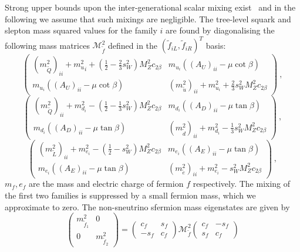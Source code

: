 \documentclass{article}
\def\half{\frac{1}{2}}
\begin{document}
Strong upper bounds upon the inter-generational scalar mixing
exist~\cite{Gabbiani:1996hi} and in the following we assume that such mixings
are negligible.
The tree-level squark and slepton mass squared values for the family $i$
are found by diagonalising the following mass
matrices ${\mathcal M}_{\tilde f}^2$ defined in the $({\tilde f}_{iL}, {\tilde
f}_{iR})^T$ basis: 
%
\begin{equation}
\label{sqmu} \left(\begin{array}{cc}
(m_{\tilde Q}^2)_{ii} + {m_u^2}_i + (\half - \frac{2}{3} s_W^2)M_Z^2c_{2\beta} &
m_{u_i}\left((A_U)_{ii}-\mu\cot\beta\right)\\
m_{u_i}\left((A_U)_{ii}-\mu\cot\beta\right) & (m^2_{\tilde u})_{ii} +
m_{u_i}^2 +
\frac{2}{3} s_W^2 M_Z^2c_{2\beta}
\end{array}\right)\ ,
\end{equation}
%
\begin{equation}
\label{sqmd}  \left(\begin{array}{cc}
(m_{\tilde Q}^2)_{ii} + m_{d_i}^2 - (\half - \frac{1}{3} s_W^2)M_Z^2c_{2\beta} &
m_{d_i}\left((A_D)_{ii}-\mu\tan\beta\right)\\
m_{d_i}\left((A_D)_{ii}-\mu\tan\beta\right) & (m^2_{\tilde d})_{ii} +
m_{d_i}^2 -\frac{1}{3} s_W^2 M_Z^2c_{2\beta}
\end{array}\right)~,
\end{equation}
%
\begin{equation}
\label{sqme}  \left(\begin{array}{cc}
(m_{\tilde L}^2)_{ii} + m_{e_i}^2 - (\half - s_W^2) M_Z^2 c_{2\beta} &
m_{e_i}\left((A_E)_{ii}-\mu\tan\beta\right)\\
m_{e_i}\left((A_E)_{ii}-\mu\tan\beta\right) & (m^2_{\tilde e})_{ii} +
m_{e_i}^2 - s_W^2 M_Z^2c_{2\beta}
\end{array}\right)~,
\end{equation}
%
$m_f, e_f$ are the mass and electric charge of fermion $f$ respectively.
The mixing of the first two families is suppressed by a small fermion mass,
which we approximate to zero.
The non-sneutrino sfermion mass eigenstates are given by
%
\begin{equation}
\left(\begin{array}{cc} m_{\tilde f_1}^2 & 0 \\ 0 & m_{\tilde f_2}^2 
\end{array} \right) =
\left(\begin{array}{cc} c_f & s_f\\-s_f & c_f \end{array}\right)
{\mathcal M}_{\tilde f} ^2
\left(\begin{array}{cc} c_f & -s_f\\s_f & c_f \end{array}\right)
\end{equation}
\end{document}
